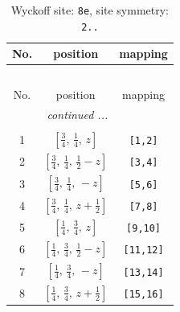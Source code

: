 \documentclass[fleqn,8pt]{jsarticle}
\begin{document}
\renewcommand{\arraystretch}{1.2}
\begin{longtable}{ccc}
\caption{Wyckoff site: {\tt 8e}, site symmetry: {\tt 2..}}
 \\
 \hline \hline
No. & position & mapping \\ \hline \endfirsthead

\multicolumn{2}{l}{\tablename\ \thetable{}} \\
 \hline \hline
No. & position & mapping \\ \hline \endhead

 \hline \hline
\multicolumn{2}{r}{\footnotesize\it continued ...} \\ \endfoot

 \hline \hline
\multicolumn{2}{r}{} \\ \endlastfoot

1 & $\left[ \frac{3}{4},\, \frac{1}{4},\, z \right]$ & {\tt [1,2]} \\ \hline
2 & $\left[ \frac{3}{4},\, \frac{1}{4},\, \frac{1}{2} - z \right]$ & {\tt [3,4]} \\ \hline
3 & $\left[ \frac{3}{4},\, \frac{1}{4},\, - z \right]$ & {\tt [5,6]} \\ \hline
4 & $\left[ \frac{3}{4},\, \frac{1}{4},\, z + \frac{1}{2} \right]$ & {\tt [7,8]} \\ \hline
5 & $\left[ \frac{1}{4},\, \frac{3}{4},\, z \right]$ & {\tt [9,10]} \\ \hline
6 & $\left[ \frac{1}{4},\, \frac{3}{4},\, \frac{1}{2} - z \right]$ & {\tt [11,12]} \\ \hline
7 & $\left[ \frac{1}{4},\, \frac{3}{4},\, - z \right]$ & {\tt [13,14]} \\ \hline
8 & $\left[ \frac{1}{4},\, \frac{3}{4},\, z + \frac{1}{2} \right]$ & {\tt [15,16]} \\
\end{longtable}
\renewcommand{\arraystretch}{1.2}
\end{document}
